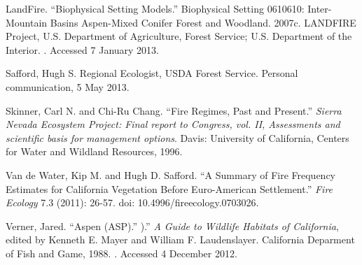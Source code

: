 \begin{hangparas}{.25in}{1}
LandFire. ``Biophysical Setting Models.'' Biophysical Setting 0610610: Inter-Mountain Basins Aspen-Mixed Conifer Forest and Woodland. 2007c. LANDFIRE Project, U.S. Department of Agriculture, Forest Service; U.S. Department of the Interior. . Accessed 7 January 2013.

Safford, Hugh S. Regional Ecologist, USDA Forest Service. Personal communication, 5 May 2013.

Skinner, Carl N. and Chi-Ru Chang. ``Fire Regimes, Past and Present.'' \emph{Sierra Nevada Ecosystem Project: Final report to Congress, vol. II, Assessments and scientific basis for management options}. Davis: University of California, Centers for Water and Wildland Resources, 1996.

Van de Water, Kip M. and Hugh D. Safford. ``A Summary of Fire Frequency Estimates for California Vegetation Before Euro-American Settlement.'' \emph{Fire Ecology} 7.3 (2011): 26-57. doi: 10.4996/fireecology.0703026.

Verner, Jared. ``Aspen (ASP).'' ).'' \emph{A Guide to Wildlife Habitats of California}, edited by Kenneth E. Mayer and William F. Laudenslayer. California Deparment of Fish and Game, 1988. . Accessed 4 December 2012.

\end{hangparas}

